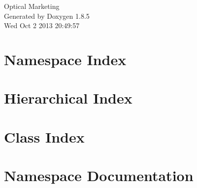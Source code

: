 \documentclass[twoside]{book}
\newcommand{\clearemptydoublepage}{%
  \newpage{\pagestyle{empty}\cleardoublepage}%
}
\begin{document}
\hypersetup{pageanchor=false}
\begin{titlepage}
\vspace*{7cm}
\begin{center}%
{\Large Optical Marketing }\\
\vspace*{1cm}
{\large Generated by Doxygen 1.8.5}\\
\vspace*{0.5cm}
{\small Wed Oct 2 2013 20:49:57}\\
\end{center}
\end{titlepage}
\clearemptydoublepage
\tableofcontents
\clearemptydoublepage
{}
\hypersetup{pageanchor=true}

\chapter{Namespace Index}

\chapter{Hierarchical Index}

\chapter{Class Index}

\chapter{Namespace Documentation}


\end{document}
